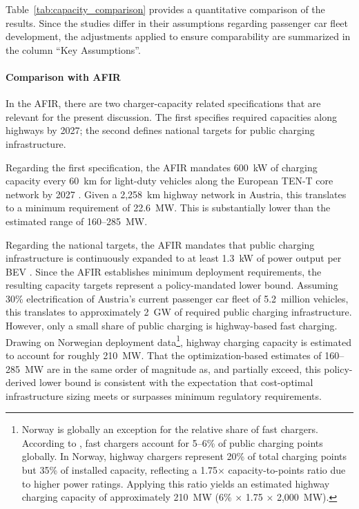 Table~\ref{tab:capacity_comparison} provides a quantitative comparison of the results. Since the studies differ in their assumptions regarding passenger car fleet development, the adjustments applied to ensure comparability are summarized in the column ``Key Assumptions''.

\paragraph*{Comparison with AFIR} In the AFIR, there are two charger-capacity related specifications that are relevant for the present discussion. The first specifies required capacities along highways by 2027; the second defines national targets for public charging infrastructure.

Regarding the first specification, the AFIR mandates 600~kW of charging capacity every 60~km for light-duty vehicles along the European TEN-T core network by 2027 \cite{EU2023AFIR}. Given a 2,258~km highway network in Austria, this translates to a minimum requirement of 22.6~MW. This is substantially lower than the estimated range of 160--285~MW.

Regarding the national targets, the AFIR mandates that public charging infrastructure is continuously expanded to at least 1.3~kW of power output per \ac{BEV} \cite{EU2023AFIR}. Since the AFIR establishes minimum deployment requirements, the resulting capacity targets represent a policy-mandated lower bound. Assuming 30\% electrification of Austria's current passenger car fleet of 5.2~million vehicles, this translates to approximately 2~GW of required public charging infrastructure. However, only a small share of public charging is highway-based fast charging. Drawing on Norwegian deployment data\footnote{Norway is globally an exception for the relative share of fast chargers. According to \citet{iea_charging_location_2025}, fast chargers account for 5--6\% of public charging points globally. In Norway, highway chargers represent 20\% of total charging points but 35\% of installed capacity, reflecting a 1.75$\times$ capacity-to-points ratio due to higher power ratings. Applying this ratio yields an estimated highway charging capacity of approximately 210~MW (6\% $\times$ 1.75 $\times$ 2,000~MW).}, highway charging capacity is estimated to account for roughly 210~MW. That the optimization-based estimates of 160--285~MW are in the same order of magnitude as, and partially exceed, this policy-derived lower bound is consistent with the expectation that cost-optimal infrastructure sizing meets or surpasses minimum regulatory requirements.


